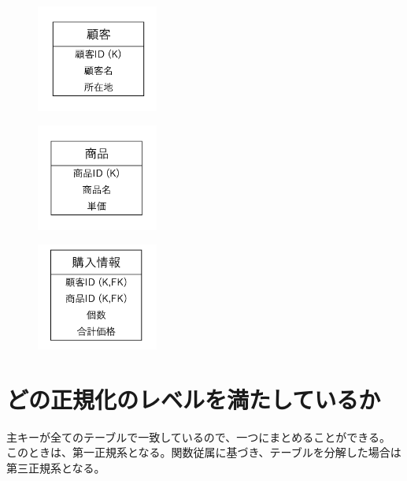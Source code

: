 \documentclass[dvipdfmx,autodetect-engine,titlepage]{jsarticle}
\begin{document}
\begin{figure}[htbp]
  \begin{minipage}{0.33\hsize}
   \begin{center}
    \includegraphics[width=40mm]{pic1.png}
   \end{center}
   \label{fig:one}
  \end{minipage}
  \begin{minipage}{0.33\hsize}
  \begin{center}
   \includegraphics[width=40mm]{pic2.png}
  \end{center}
   \label{fig:two}
  \end{minipage}
  \begin{minipage}{0.33\hsize}
  \begin{center}
   \includegraphics[width=40mm]{pic3.png}
  \end{center}
   \label{fig:three}
  \end{minipage}
 \end{figure}

 \newpage

\section{どの正規化のレベルを満たしているか}

主キーが全てのテーブルで一致しているので、一つにまとめることができる。
このときは、第一正規系となる。関数従属に基づき、テーブルを分解した場合は第三正規系となる。
\end{document}

